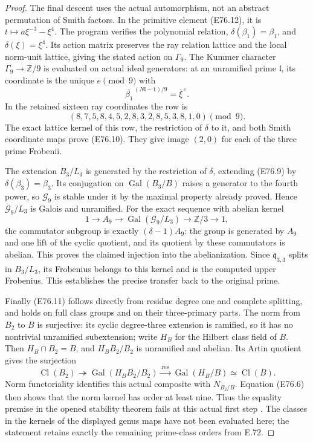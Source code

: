 \begin{proof}
The final descent uses the actual automorphism,
not an abstract permutation of Smith factors.
In the primitive element (E76.12), it is
$t\mapsto a\xi^{-3}-\xi^4$. The program verifies
the polynomial relation, $\delta(\beta_1)=\beta_1$,
and $\delta(\xi)=\xi^4$. Its action matrix preserves
the ray relation lattice and the local norm-unit
lattice, giving the stated action on $\Gamma_9$.
The Kummer character $\Gamma_9\to\mathbb Z/9$
is evaluated on actual ideal generators: at an
unramified prime $\mathfrak l$, its coordinate is
the unique $e\pmod9$ with
\[
       \overline{\beta_1}^{\,(N\mathfrak l-1)/9}
                         =\overline\xi^{\,e}.
 \tag{E76.19}
\]
In the retained sixteen ray coordinates the row is
\[
 (8,7,5,8,4,5,2,8,3,2,8,5,3,8,1,0)\pmod9.
 \tag{E76.20}
\]
The exact lattice kernel of this row, the
restriction of $\delta$ to it, and both Smith
coordinate maps prove (E76.10). They give image
$(2,0)$ for each of the three prime Frobenii.

The extension $B_3/L_3$ is generated by the
restriction of $\delta$, extending (E76.9) by
$\delta(\beta_3)=\beta_3$. Its conjugation on
$\operatorname{Gal}(B_3/B)$ raises a generator
to the fourth power, so $\mathcal G_9$ is stable
under it by the maximal property already proved.
Hence $\mathcal G_9/L_3$ is Galois and unramified.
For the exact sequence with abelian kernel
\[
 1\longrightarrow A_9\longrightarrow
 \operatorname{Gal}(\mathcal G_9/L_3)
 \longrightarrow\mathbb Z/3\longrightarrow1,
 \tag{E76.21}
\]
the commutator subgroup is exactly $(\delta-1)A_9$:
the group is generated by $A_9$ and one lift of
the cyclic quotient, and its quotient by these
commutators is abelian. This proves the claimed
injection into the abelianization. Since
$\mathfrak q_{3,3}$ splits in $B_3/L_3$, its
Frobenius belongs to this kernel and is the
computed upper Frobenius. This establishes the
precise transfer back to the original prime.

Finally (E76.11) follows directly from residue
degree one and complete splitting, and holds
on full class groups and on their three-primary
parts. The norm from $B_2$ to $B$ is surjective:
its cyclic degree-three extension is ramified,
so it has no nontrivial unramified subextension;
write $H_B$ for the Hilbert class field of $B$.
Then $H_B\cap B_2=B$, and $H_BB_2/B_2$ is unramified
and abelian. Its Artin quotient gives the surjection
\[
 \operatorname{Cl}(B_2)\twoheadrightarrow
 \operatorname{Gal}(H_BB_2/B_2)
 \xrightarrow{\ \mathrm{res}\ }\operatorname{Gal}(H_B/B)
 \simeq\operatorname{Cl}(B).
\]
Norm functoriality identifies this actual composite with
$N_{B_2/B}$. Equation (E76.6) then shows that
the norm kernel has order at least nine. Thus
the equality premise in the opened stability
theorem fails at this actual first step
\cite[Proposition~3.2 and its full proof]{E_LOXZKummer}.
The classes in the kernels of the displayed
genus maps have not been evaluated here; the
statement retains exactly the remaining
prime-class orders from E.72.
\end{proof}
